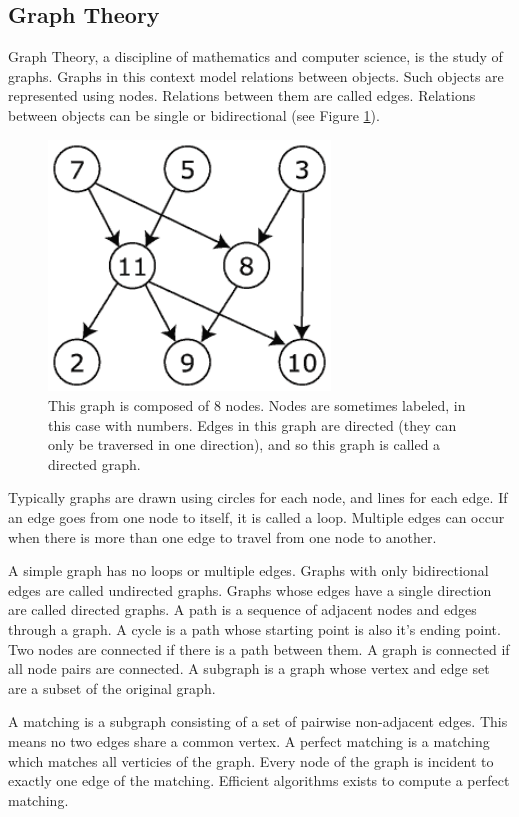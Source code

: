 \documentclass[12pt]{article}
\begin{document}
\subsection{Graph Theory}

Graph Theory, a discipline of mathematics and computer science, is the study of graphs. Graphs in this context model relations between objects. Such objects are represented using nodes. Relations between them are called edges. Relations between objects can be single or bidirectional (see Figure \ref{fig:graph}).  

\begin{figure}[ht!]
\centering
\includegraphics[width=75mm]{graph.png}
\caption{This graph is composed of 8 nodes. Nodes are sometimes labeled, in this case with numbers. Edges in this graph are directed (they can only be traversed in one direction), and so this graph is called a directed graph.}
\label{fig:graph}
\end{figure}

Typically graphs are drawn using circles for each node, and lines for each edge. If an edge goes from one node to itself, it is called a loop. Multiple edges can occur when there is more than one edge to travel from one node to another. 

A simple graph has no loops or multiple edges. Graphs with only bidirectional edges are called undirected graphs. Graphs whose edges have a single direction are called directed graphs. A path is a sequence of adjacent nodes and edges through a graph. A cycle is a path whose starting point is also it's ending point. Two nodes are connected if there is a path between them. A graph is connected if all node pairs are connected. A subgraph is a graph whose vertex and edge set are a subset of the original graph. 

A matching is a subgraph consisting of a set of pairwise non-adjacent edges. This means no two edges share a common vertex. A perfect matching is a matching which matches all verticies of the graph. Every node of the graph is incident to exactly one edge of the matching. Efficient algorithms exists to compute a perfect matching.
\end{document}
